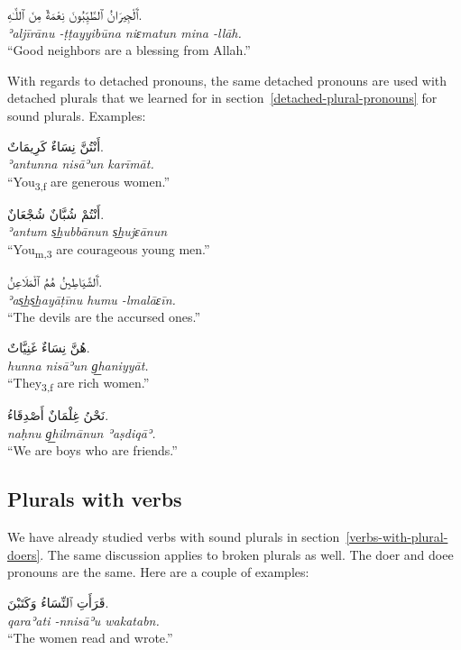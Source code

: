 \documentclass[
  10pt,
]{book}
\begin{document}
\foreignlanguage{arabic}{ٱَلْجِيرَانُ ٱلطَّيِّبُونَ نِعْمَةٌ مِنَ ٱللَّـٰهِ.}\\
\emph{ʾaljīrānu -ṭṭayyibūna niɛmatun mina -llāh.}\\
\enquote{Good neighbors are a blessing from Allah.}

With regards to detached pronouns, the same detached pronouns are used with detached plurals that we learned for in section~\ref{detached-plural-pronouns} for sound plurals. Examples:

\foreignlanguage{arabic}{أَنْتُنَّ نِسَاءٌ کَرِيمَاتٌ.}\\
\emph{ʾantunna nisāʾun karīmāt.}\\
\enquote{You\textsubscript{3,f} are generous women.}

\foreignlanguage{arabic}{أَنْتُمْ شُبَّانٌ شُجْعَانٌ.}\\
\emph{ʾantum s͟hubbānun s͟hujɛānun}\\
\enquote{You\textsubscript{m,3} are courageous young men.}

\foreignlanguage{arabic}{ٱَلشَّيَاطِينُ هُمُ ٱلْمَلَاعِنُ.}\\
\emph{ʾas͟hs͟hayāṭīnu humu -lmalāɛīn.}\\
\enquote{The devils are the accursed ones.}

\foreignlanguage{arabic}{هُنَّ نِسَاءٌ غَنِيَّاتٌ.}\\
\emph{hunna nisāʾun g͟haniyyāt.}\\
\enquote{They\textsubscript{3,f} are rich women.}

\foreignlanguage{arabic}{نَحْنُ غِلْمَانٌ أَصْدِقَاءُ.}\\
\emph{naḥnu g͟hilmānun ʾaṣdiqāʾ.}\\
\enquote{We are boys who are friends.}

\subsection{Plurals with verbs}\label{plurals-with-verbs}

We have already studied verbs with sound plurals in section~\ref{verbs-with-plural-doers}. The same discussion applies to broken plurals as well. The doer and doee pronouns are the same. Here are a couple of examples:

\foreignlanguage{arabic}{قَرَأَتِ ٱلنِّسَاءُ وَکَتَبْنَ.}\\
\emph{qaraʾati -nnisāʾu wakatabn.}\\
\enquote{The women read and wrote.}
\end{document}
